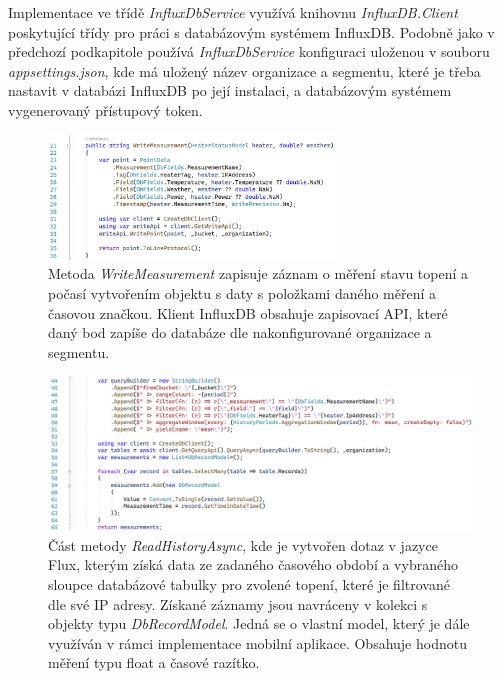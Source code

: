 Implementace ve třídě {\it InfluxDbService} využívá knihovnu {\it InfluxDB.Client} poskytující třídy pro práci s databázovým systémem InfluxDB. Podobně jako v předchozí podkapitole používá {\it InfluxDbService} konfiguraci uloženou v souboru {\it appsettings.json}, kde má uložený název organizace a segmentu, které je třeba nastavit v databázi InfluxDB po její instalaci, a databázovým systémem vygenerovaný přístupový token.

\begin{figure}[hbt]
\includegraphics[width=0.68\textwidth]{obrazky-figures/code-influx-write.png}
\caption{Metoda {\it WriteMeasurement} zapisuje záznam o měření stavu topení a počasí vytvořením objektu s daty s položkami daného měření a časovou značkou. Klient InfluxDB obsahuje zapisovací API, které daný bod zapíše do databáze dle nakonfigurované organizace a segmentu.}
\end{figure}

\begin{figure}[hbt]
\includegraphics[width=1.05\textwidth]{obrazky-figures/code-influx-read.png}
\caption{Část metody {\it ReadHistoryAsync}, kde je vytvořen dotaz v jazyce Flux, kterým získá data ze zadaného časového období a vybraného sloupce databázové tabulky pro zvolené topení, které je filtrované dle své IP adresy. Získané záznamy jsou navráceny v kolekci s objekty typu {\it DbRecordModel}. Jedná se o vlastní model, který je dále využíván v rámci implementace mobilní aplikace. Obsahuje hodnotu měření typu float a časové razítko.}
\end{figure}

\pagebreak

